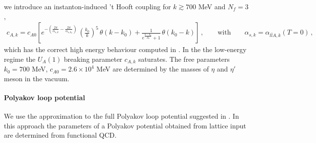 \documentclass[reprint,twocolumn,superscriptaddress,preprintnumbers,amsmath,amssymb,aps,prd,floatfix]{revtex4-2}
\begin{document}
we introduce an instanton-induced 't Hooft coupling for $k \gtrsim 700$ MeV \cite{Pawlowski:1996ch} and $N_f=3$,
%
\begin{align}
 c_{A,k} =c_{A0} \left[ e^{- \left( \frac{2 \pi}{\alpha_{s,k}}-  \frac{2 \pi}{\alpha_{s,k_0} }\right) }\, \left(\frac{k_0}{k}\right)^{5}\,\theta(k-k_0) +
  \frac{1 }{e^{\frac{k-k_{0}}{\Delta_k}}+1}\,\theta(k_0-k)\right]\,, \qquad \textrm{with}\qquad  \alpha_{s,k}=\alpha_{l\bar lA,k}(T=0)\,,
 \label{eq:cAdefinition}
 \end{align}
%
which has the correct high energy behaviour computed in \cite{Pawlowski:1996ch}. In the the low-energy regime the $U_A(1)$ breaking parameter $c_{A,k}$ saturates. The free parameters $k_{0}=700$ MeV, $c_{A0}=2.6\times 10^4$ MeV are determined by the masses of $\eta$ and $\eta'$ meson in the vacuum.\\[-2ex]


\paragraph{Polyakov loop potential} 
\label{app:PolPot}

We use the approximation to the full Polyakov loop potential suggested in \cite{Haas:2013qwp}. In this approach the parameters of a Polyakov potential obtained from lattice input are determined from functional QCD.  
\end{document}
